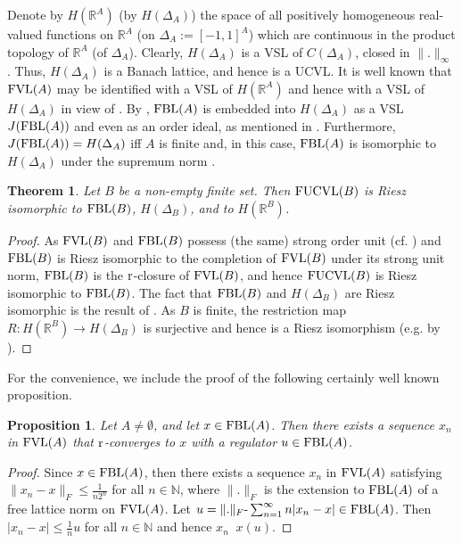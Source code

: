 \documentclass[12pt]{article}
\newtheorem{thm}{Theorem}
\newtheorem{prop}{Proposition}
\DeclareMathOperator{\ruc}{\xrightarrow[]{r}}
\renewcommand{\le}{\leqslant}
\newcommand{\R}{\mathbb{R}}
\newcommand{\N}{\mathbb{N}}
\begin{document}
\smallskip
Denote by $H(\R^A)$ (by $H(\Delta_A)$) the space of all positively 
homogeneous real-valued functions on $\R^A$ (on $\Delta_A:=[-1,1]^A$) 
which are continuous in the product topology of $\R^A$ (of $\Delta_A$). 
Clearly, $H(\Delta_A)$ is a VSL of $C(\Delta_A)$, closed in $\|.\|_\infty$. 
Thus, $H(\Delta_A)$ is a Banach lattice, and hence is a UCVL. 
It is well known that $\text{\rm FVL}(A)$ may be identified with a VSL of $H(\R^A)$ 
and hence with a VSL of $H(\Delta_A)$ in view of \cite[Lemma~5.1]{PW}. 
By \cite[Corollary~5.7]{PW}, $\text{\rm FBL}(A)$ is embedded into $H(\Delta_A)$ as 
a VSL $J(\text{\rm FBL}(A))$ and even as an order ideal, as mentioned in \cite{PW}. 
Furthermore,  $J(\text{\rm FBL}(A))=H(\Delta_A)$ iff $A$ is finite and, in this case,  
$\text{\rm FBL}(A)$ is isomorphic to $H(\Delta_A)$ under 
the supremum norm \cite[Theorem~8.2]{PW}.

\begin{thm}\label{l2}
Let $B$ be a non-empty finite set. Then $\text{\rm FUCVL}(B)$ is Riesz isomorphic 
to $\text{\rm FBL}(B)$, $H(\Delta_B)$, and to $H(\R^B)$. 
\end{thm}

\begin{proof}
As $\text{\rm FVL}(B)$ and $\text{\rm FBL}(B)$ possess (the same) strong 
order unit (cf. \cite[Proposition~5.3 and Theorem~8.2]{PW}) and $\text{\rm FBL}(B)$ 
is Riesz isomorphic to the completion of $\text{\rm FVL}(B)$ under its strong unit norm, 
$\text{\rm FBL}(B)$ is the $\text{\rm r}$-closure of $\text{\rm FVL}(B)$,
and hence $\text{\rm FUCVL}(B)$ is Riesz isomorphic to $\text{\rm FBL}(B)$.
The fact that $\text{\rm FBL}(B)$ 
and $H(\Delta_B)$ are Riesz isomorphic is the result of \cite[Proposition~5.3]{PW}. 
As $B$ is finite, the restriction map $R: H(\R^B) \to H(\Delta_B)$ is 
surjective and hence is a Riesz isomorphism (e.g. by \cite[Lemma~5.1]{PW}).
\end{proof}

For the convenience, we include the proof of the following certainly well known proposition.

\begin{prop}\label{p2}
Let $A\ne\emptyset$, and let $x\in\text{\rm FBL}(A)$. 
Then  there exists a sequence $x_n$ in $\text{\rm FVL}(A)$ 
that $\text{\rm r}$-converges to $x$ with a regulator $u\in\text{\rm FBL}(A)$.
\end{prop}

\begin{proof}
Since  $x\in\text{\rm FBL}(A)$, then there exists a sequence $x_n$ in $\text{\rm FVL}(A)$ 
satisfying $\|x_n - x\|_F \le \frac{1}{n2^n}$ for all $n\in \N$, where $\|.\|_F$ is 
the extension to $\text{\rm FBL}(A)$ of a free lattice norm on $\text{\rm FVL}(A)$. 
Let $u=\|.\|_F\text{-}\sum_{n=1}^{\infty}n |x_n -x|\in\text{\rm FBL}(A)$. 
Then $|x_n -x| \le\frac{1}{n}u$  for all $n\in \N$
and hence $x_n \ruc x(u)$.
\end{proof}
\end{document}
